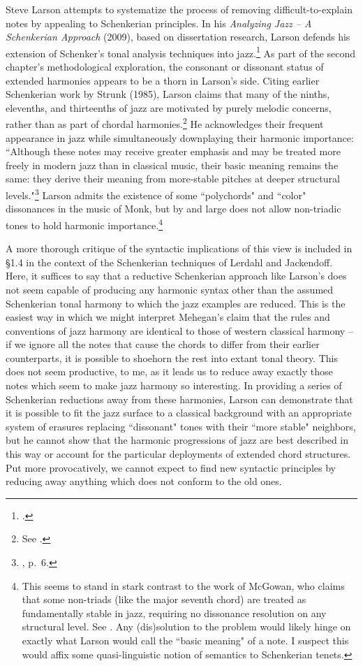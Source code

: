 Steve Larson attempts to systematize the process of removing difficult-to-explain notes by appealing to Schenkerian principles.  In his \emph{Analyzing Jazz -- A Schenkerian Approach} (2009), based on dissertation research, Larson defends his extension of Schenker's tonal analysis techniques into jazz.\footnote{\cite{larson2009}.}  As part of the second chapter's methodological exploration, the consonant or dissonant status of extended harmonies appears to be a thorn in Larson's side.  Citing earlier Schenkerian work by Strunk (1985), Larson claims that many of the ninths, elevenths, and thirteenths of jazz are motivated by purely melodic concerns, rather than as part of chordal harmonies.\footnote{See \cite{strunk1985}.}  He acknowledges their frequent appearance in jazz while simultaneously downplaying their harmonic importance: ``Although these notes may receive greater emphasis and may be treated more freely in modern jazz than in classical music, their basic meaning remains the same: they derive their meaning from more-stable pitches at deeper structural levels."\footnote{\cite{larson2009}, p.\ 6.}  Larson admits the existence of some ``polychords" and ``color" dissonances in the music of Monk, but by and large does not allow non-triadic tones to hold harmonic importance.\footnote{This seems to stand in stark contrast to the work of McGowan, who claims that some non-triads (like the major seventh chord) are treated as fundamentally stable in jazz, requiring no dissonance resolution on any structural level.  See \cite{mcgowan2008}.  Any (dis)solution to the problem would likely hinge on exactly what Larson would call the ``basic meaning" of a note.  I suspect this would affix some quasi-linguistic notion of semantics to Schenkerian tenets.}

A more thorough critique of the syntactic implications of this view is included in \S 1.4 in the context of the Schenkerian techniques of Lerdahl and Jackendoff.  Here, it suffices to say that a reductive Schenkerian approach like Larson's does not seem capable of producing any harmonic syntax other than the assumed Schenkerian tonal harmony to which the jazz examples are reduced.  This is the easiest way in which we might interpret Mehegan's claim that the rules and conventions of jazz harmony are identical to those of western classical harmony -- if we ignore all the notes that cause the chords to differ from their earlier counterparts, it is possible to shoehorn the rest into extant tonal theory.  This does not seem productive, to me, as it leads us to reduce away exactly those notes which seem to make jazz harmony so interesting.  In providing a series of Schenkerian reductions away from these harmonies, Larson can demonstrate that it is possible to fit the jazz surface to a classical background with an appropriate system of erasures replacing ``dissonant" tones with their ``more stable" neighbors, but he cannot show that the harmonic progressions of jazz are best described in this way or account for the particular deployments of extended chord structures.  Put more provocatively, we cannot expect to find new syntactic principles by reducing away anything which does not conform to the old ones.

